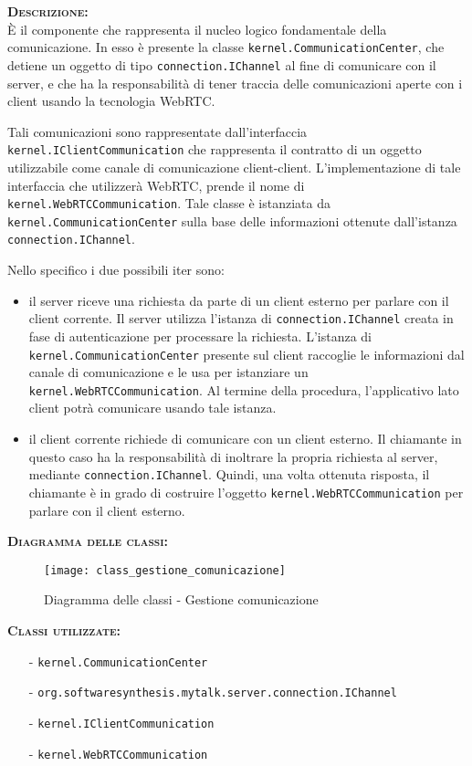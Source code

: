\begin{description}
	\item{\scshape\bfseries Descrizione:}\\
È il componente che rappresenta il nucleo logico fondamentale della comunicazione. In esso è presente la classe \texttt{kernel.CommunicationCenter}, che detiene un oggetto di tipo \texttt{connection.IChannel} al fine di comunicare con il server, e che ha la responsabilità di tener traccia delle comunicazioni aperte con i client usando la tecnologia WebRTC\@.

Tali comunicazioni sono rappresentate dall'interfaccia \texttt{kernel.IClientCommunication} che rappresenta il contratto di un oggetto utilizzabile come canale di comunicazione client-client. L'implementazione di tale interfaccia che utilizzerà WebRTC, prende il nome di \texttt{kernel.WebRTCCommunication}. Tale classe è istanziata da \texttt{kernel.CommunicationCenter} sulla base delle informazioni ottenute dall'istanza \texttt{connection.IChannel}. 

Nello specifico i due possibili iter sono:
\begin{itemize}
	\item il server riceve una richiesta da parte di un client esterno per parlare con il client corrente. Il server utilizza l'istanza di \texttt{connection.IChannel} creata in fase di autenticazione per processare la richiesta. L'istanza di \texttt{kernel.CommunicationCenter} presente sul client raccoglie le informazioni dal canale di comunicazione e le usa per istanziare un \texttt{kernel.WebRTCCommunication}. Al termine della procedura, l'applicativo lato client potrà comunicare usando tale istanza.
	\item il client corrente richiede di comunicare con un client esterno. Il chiamante in questo caso ha la responsabilità di inoltrare la propria richiesta al server, mediante \texttt{connection.IChannel}. Quindi, una volta ottenuta risposta, il chiamante è in grado di costruire l'oggetto \texttt{kernel.WebRTCCommunication} per parlare con il client esterno.
\end{itemize}

	\item{\scshape\bfseries Diagramma delle classi:}
  \begin{figure}[H]
    \centering
    \texttt{[image: class\_gestione\_comunicazione]}
    \caption{Diagramma delle classi - Gestione comunicazione}\label{fig:gestionecomunicazione}
  \end{figure}

	\item{\scshape\bfseries Classi utilizzate:} 
	\begin{itemize}[noitemsep,nolistsep]
		\item[-] \texttt{kernel.CommunicationCenter}
		\item[-] \texttt{org.softwaresynthesis.mytalk.server.connection.IChannel}
		\item[-] \texttt{kernel.IClientCommunication}
		\item[-] \texttt{kernel.WebRTCCommunication}
	\end{itemize}  
\end{description}

